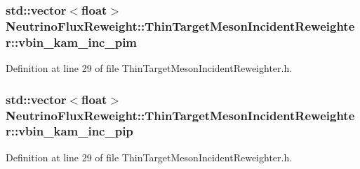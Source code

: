 \hypertarget{class_neutrino_flux_reweight_1_1_thin_target_meson_incident_reweighter_a8a9fa5100a6c1a2031a1263ad6ed5312}{
\subsubsection[{vbin\-\_\-kam\-\_\-inc\-\_\-pim}]{\setlength{\rightskip}{0pt plus 5cm}std\-::vector$<$float$>$ Neutrino\-Flux\-Reweight\-::\-Thin\-Target\-Meson\-Incident\-Reweighter\-::vbin\-\_\-kam\-\_\-inc\-\_\-pim}}\label{class_neutrino_flux_reweight_1_1_thin_target_meson_incident_reweighter_a8a9fa5100a6c1a2031a1263ad6ed5312}


Definition at line 29 of file Thin\-Target\-Meson\-Incident\-Reweighter.\-h.

\hypertarget{class_neutrino_flux_reweight_1_1_thin_target_meson_incident_reweighter_ac82429351c909aeaafe750d0fe4403cb}{
\subsubsection[{vbin\-\_\-kam\-\_\-inc\-\_\-pip}]{\setlength{\rightskip}{0pt plus 5cm}std\-::vector$<$float$>$ Neutrino\-Flux\-Reweight\-::\-Thin\-Target\-Meson\-Incident\-Reweighter\-::vbin\-\_\-kam\-\_\-inc\-\_\-pip}}\label{class_neutrino_flux_reweight_1_1_thin_target_meson_incident_reweighter_ac82429351c909aeaafe750d0fe4403cb}


Definition at line 29 of file Thin\-Target\-Meson\-Incident\-Reweighter.\-h.

